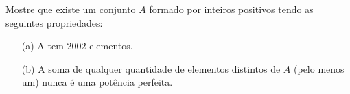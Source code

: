 Mostre que existe um conjunto $A$ formado por inteiros positivos tendo as seguintes propriedades:
\begin{itemize}
	\item[(a)] A tem $2002$ elementos.
	\item[(b)] A soma de qualquer quantidade de elementos distintos de $A$ (pelo menos um) nunca é uma potência perfeita.
\end{itemize}

